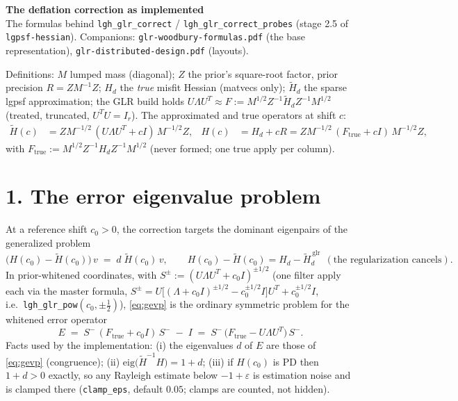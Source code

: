 \documentclass[11pt]{article}
\begin{document}
\begin{center}\textbf{The deflation correction as implemented}\\[2pt]
\small The formulas behind \texttt{lgh\_glr\_correct} /
\texttt{lgh\_glr\_correct\_probes} (stage 2.5 of \texttt{lgpsf-hessian}).
Companions: \texttt{glr-woodbury-formulas.pdf} (the base representation),
\texttt{glr-distributed-design.pdf} (layouts).
\end{center}

Definitions: $M$ lumped mass (diagonal); $Z$ the prior's square-root factor,
prior precision $R = Z M^{-1} Z$; $H_d$ the \emph{true} misfit Hessian
(matvecs only); $\widetilde{H}_d$ the sparse lgpsf approximation; the GLR
build holds $U \Lambda U^T \approx F := M^{1/2} Z^{-1} \widetilde{H}_d
Z^{-1} M^{1/2}$ (treated, truncated, $U^T U = I_r$).  The approximated and
true operators at shift $c$:
\begin{align}
\widetilde{H}(c) &= Z M^{-1/2}\,(U \Lambda U^T + cI)\,M^{-1/2} Z, &
H(c) &= H_d + c R = Z M^{-1/2}\,(F_{\mathrm{true}} + cI)\,M^{-1/2} Z,
\end{align}
with $F_{\mathrm{true}} := M^{1/2} Z^{-1} H_d Z^{-1} M^{1/2}$ (never formed;
one true apply per column).

\section*{1. The error eigenvalue problem}

At a reference shift $c_0 > 0$, the correction targets the dominant
eigenpairs of the generalized problem
\begin{equation}
\bigl(H(c_0) - \widetilde{H}(c_0)\bigr)\, v \;=\; d\; \widetilde{H}(c_0)\, v ,
\qquad H(c_0) - \widetilde{H}(c_0) = H_d - \widetilde{H}_d^{\,\mathrm{glr}}
\ \ (\text{the regularization cancels}).
\label{eq:gevp}
\end{equation}
In prior-whitened coordinates, with
$S^{\pm} := (U \Lambda U^T + c_0 I)^{\pm 1/2}$ (one filter apply each via
the master formula,
$S^{\pm} = U\bigl[(\Lambda + c_0 I)^{\pm 1/2} - c_0^{\pm 1/2} I\bigr]U^T
+ c_0^{\pm 1/2} I$, i.e.\ \texttt{lgh\_glr\_pow}$(c_0, \pm\tfrac12)$),
\eqref{eq:gevp} is the ordinary symmetric problem for the whitened error
operator
\begin{equation}
E \;=\; S^-\,(F_{\mathrm{true}} + c_0 I)\,S^- \;-\; I
   \;=\; S^-\,\bigl(F_{\mathrm{true}} - U \Lambda U^T\bigr)\,S^- .
\label{eq:Ew}
\end{equation}
Facts used by the implementation: (i) the eigenvalues $d$ of $E$ are those of
\eqref{eq:gevp} (congruence); (ii)
$\mathrm{eig}\bigl(\widetilde{H}^{-1} H\bigr) = 1 + d$; (iii) if $H(c_0)$ is
PD then $1 + d > 0$ exactly, so any Rayleigh estimate below
$-1+\varepsilon$ is estimation noise and is clamped there
(\texttt{clamp\_eps}, default $0.05$; clamps are counted, not hidden).
\end{document}

